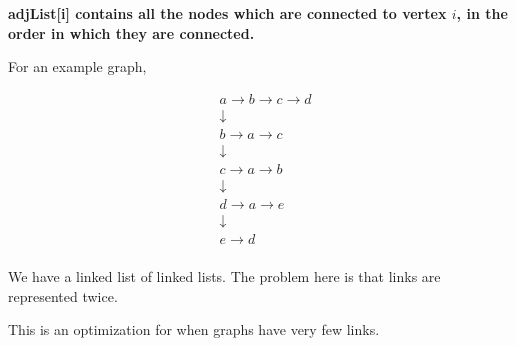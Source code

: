 \documentclass[11pt]{article}
\begin{document}
\begin{enumerate}
\textbf{adjList[i] contains all the nodes which are connected to vertex \(i\), in the order in which they are connected.}

For an example graph,

\begin{align*}
&a \rightarrow b \rightarrow c \rightarrow d  \\
&\downarrow \\
&b \rightarrow a \rightarrow c \\
&\downarrow \\
&c \rightarrow a \rightarrow b \\
&\downarrow \\
&d \rightarrow a \rightarrow e\\
&\downarrow \\
&e \rightarrow d \\
\end{align*}

We have a linked list of linked lists. The problem here is that links are represented twice.

This is an optimization for when graphs have very few links.
\end{enumerate}
\end{document}
